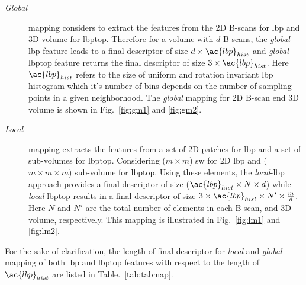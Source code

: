 \begin{description}
\item[\emph{Global}] mapping considers to extract the features from the 2D B-scans for \ac{lbp} and 3D volume for \ac{lbptop}.
Therefore for a volume with $d$ B-scans, the \emph{global}-\ac{lbp} feature leads to a final descriptor of size $d \times \ac{lbp}_{hist}$ and \emph{global}-\ac{lbptop} feature returns the final descriptor of size $3 \times \ac{lbp}_{hist}$.
Here $\ac{lbp}_{hist}$ refers to the size of uniform and rotation invariant \ac{lbp} histogram which it's number of bins depends on the number of sampling points in a given neighborhood.
The \emph{global} mapping for 2D B-scan end 3D volume is shown in Fig.~\ref{fig:gm1} and \ref{fig:gm2}.

\item[\emph{Local}] mapping extracts the features from a set of 2D patches for \ac{lbp} and a set of sub-volumes for \ac{lbptop}.
Considering ($m \times m$) \acf{sw} for 2D \ac{lbp} and ($ m \times m \times m$) sub-volume for \ac{lbptop}.
Using these elements, the \emph{local}-\ac{lbp} approach provides a final descriptor of size ($\ac{lbp}_{hist} \times N \times d $) while \emph{local}-\ac{lbptop} results in a final descriptor of size $3 \times \ac{lbp}_{hist} \times N' \times \frac{m}{d}$.
Here $N$ and $N'$ are the total number of elements in each B-scan, and 3D volume, respectively.
This mapping is illustrated in Fig.~\ref{fig:lm1} and \ref{fig:lm2}.


\end{description}




For the sake of clarification, the length of final descriptor for \emph{local} and \emph{global} mapping of both \ac{lbp} and \ac{lbptop} features with respect to the length of $\ac{lbp}_{hist}$ are listed in Table.~\ref{tab:tabmap}.

